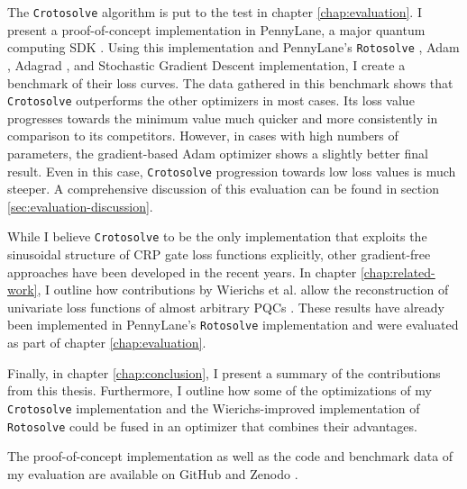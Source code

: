 The \texttt{Crotosolve} algorithm is put to the test in chapter
\ref{chap:evaluation}.
I present a proof-of-concept implementation in PennyLane, a major quantum
computing SDK \cite{bergholm_pennylane_2022,unitary_fund_team_results_2022}.
Using this implementation and PennyLane's
\texttt{Rotosolve} \cite{ostaszewski_structure_2021},
Adam \cite{kingma_adam_2017},
Adagrad \cite{duchi_adaptive_2011}, and
Stochastic Gradient Descent implementation, I create a benchmark of their loss
curves.
The data gathered in this benchmark shows that \texttt{Crotosolve} outperforms
the other optimizers in most cases.
Its loss value progresses towards the minimum value much quicker and more
consistently in comparison to its competitors.
However, in cases with high numbers of parameters, the gradient-based Adam
optimizer shows a slightly better final result.
Even in this case, \texttt{Crotosolve} progression towards low loss values is
much steeper. 
A comprehensive discussion of this evaluation can be found in section
\ref{sec:evaluation-discussion}.

While I believe \texttt{Crotosolve} to be the only implementation that exploits
the sinusoidal structure of CRP gate loss functions explicitly, other
gradient-free approaches have been developed in the recent years.
In chapter \ref{chap:related-work}, I outline how contributions by
Wierichs et al. allow the reconstruction of univariate loss functions of almost
arbitrary PQCs \cite{wierichs_general_2022}.
These results have already been implemented in PennyLane's \texttt{Rotosolve}
implementation and were evaluated as part of chapter \ref{chap:evaluation}.

Finally, in chapter \ref{chap:conclusion}, I present a summary of the
contributions from this thesis.
Furthermore, I outline how some of the optimizations of my \texttt{Crotosolve}
implementation and the Wierichs-improved implementation of \texttt{Rotosolve}
could be fused in an optimizer that combines their advantages.

The proof-of-concept implementation as well as the code and benchmark data of my
evaluation are available on GitHub and Zenodo \cite{crotosolve}.
